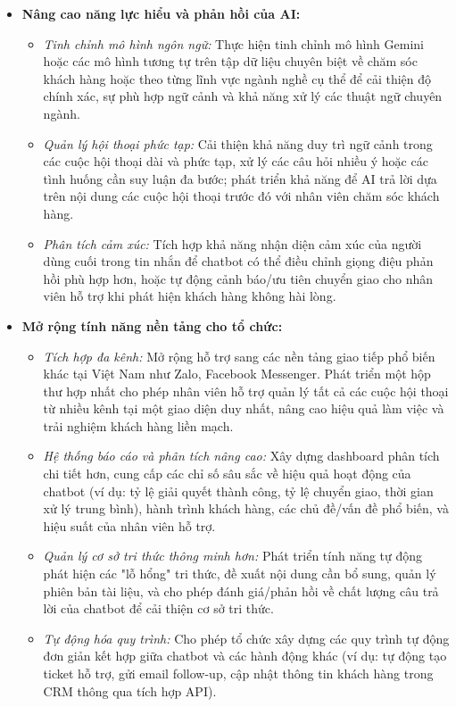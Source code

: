 \begin{itemize}
    \item \textbf{Nâng cao năng lực hiểu và phản hồi của AI:}
        \begin{itemize}
            \item \textit{Tinh chỉnh mô hình ngôn ngữ:} Thực hiện tinh chỉnh mô hình Gemini hoặc các mô hình tương tự trên tập dữ liệu chuyên biệt về chăm sóc khách hàng hoặc theo từng lĩnh vực ngành nghề cụ thể để cải thiện độ chính xác, sự phù hợp ngữ cảnh và khả năng xử lý các thuật ngữ chuyên ngành.
            \item \textit{Quản lý hội thoại phức tạp:} Cải thiện khả năng duy trì ngữ cảnh trong các cuộc hội thoại dài và phức tạp, xử lý các câu hỏi nhiều ý hoặc các tình huống cần suy luận đa bước; phát triển khả năng để AI trả lời dựa trên nội dung các cuộc hội thoại trước đó với nhân viên chăm sóc khách hàng.
            \item \textit{Phân tích cảm xúc:} Tích hợp khả năng nhận diện cảm xúc của người dùng cuối trong tin nhắn để chatbot có thể điều chỉnh giọng điệu phản hồi phù hợp hơn, hoặc tự động cảnh báo/ưu tiên chuyển giao cho nhân viên hỗ trợ khi phát hiện khách hàng không hài lòng.
        \end{itemize}

    \item \textbf{Mở rộng tính năng nền tảng cho tổ chức:}
        \begin{itemize}
            \item \textit{Tích hợp đa kênh:} Mở rộng hỗ trợ sang các nền tảng giao tiếp phổ biến khác tại Việt Nam như Zalo, Facebook Messenger. Phát triển một hộp thư hợp nhất cho phép nhân viên hỗ trợ quản lý tất cả các cuộc hội thoại từ nhiều kênh tại một giao diện duy nhất, nâng cao hiệu quả làm việc và trải nghiệm khách hàng liền mạch.
            \item \textit{Hệ thống báo cáo và phân tích nâng cao:} Xây dựng dashboard phân tích chi tiết hơn, cung cấp các chỉ số sâu sắc về hiệu quả hoạt động của chatbot (ví dụ: tỷ lệ giải quyết thành công, tỷ lệ chuyển giao, thời gian xử lý trung bình), hành trình khách hàng, các chủ đề/vấn đề phổ biến, và hiệu suất của nhân viên hỗ trợ.
            \item \textit{Quản lý cơ sở tri thức thông minh hơn:} Phát triển tính năng tự động phát hiện các "lỗ hổng" tri thức, đề xuất nội dung cần bổ sung, quản lý phiên bản tài liệu, và cho phép đánh giá/phản hồi về chất lượng câu trả lời của chatbot để cải thiện cơ sở tri thức.
            \item \textit{Tự động hóa quy trình:} Cho phép tổ chức xây dựng các quy trình tự động đơn giản kết hợp giữa chatbot và các hành động khác (ví dụ: tự động tạo ticket hỗ trợ, gửi email follow-up, cập nhật thông tin khách hàng trong CRM thông qua tích hợp API).
        \end{itemize}


\end{itemize}
